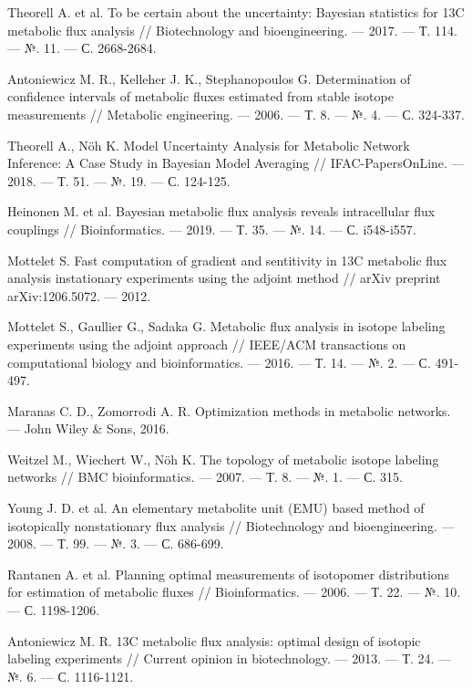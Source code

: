 \documentclass[14pt, a4paper]{extreport}
\begin{document}
\begin{thebibliography}{XXXX}
	
	Theorell A. et al. To be certain about the uncertainty: Bayesian statistics for 13C metabolic flux analysis // Biotechnology and bioengineering. --- 2017. --- Т. 114. --- №. 11. --- С. 2668-2684.
	
	Antoniewicz M. R., Kelleher J. K., Stephanopoulos G. Determination of confidence intervals of metabolic fluxes estimated from stable isotope measurements // Metabolic engineering. --- 2006. --- Т. 8. --- №. 4. --- С. 324-337.
	
	Theorell A., Nöh K. Model Uncertainty Analysis for Metabolic Network Inference: A Case Study in Bayesian Model Averaging // IFAC-PapersOnLine. --- 2018. --- Т. 51. --- №. 19. --- С. 124-125.
	
	Heinonen M. et al. Bayesian metabolic flux analysis reveals intracellular flux couplings // Bioinformatics. --- 2019. --- Т. 35. --- №. 14. --- С. i548-i557.
	
	Mottelet S. Fast computation of gradient and sentitivity in 13C metabolic flux analysis instationary experiments using the adjoint method // arXiv preprint arXiv:1206.5072. --- 2012.
	
	Mottelet S., Gaullier G., Sadaka G. Metabolic flux analysis in isotope labeling experiments using the adjoint approach // IEEE/ACM transactions on computational biology and bioinformatics. --- 2016. --- Т. 14. --- №. 2. --- С. 491-497.
	
	Maranas C. D., Zomorrodi A. R. Optimization methods in metabolic networks. --- John Wiley \& Sons, 2016.
	
	Weitzel M., Wiechert W., Nöh K. The topology of metabolic isotope labeling networks // BMC bioinformatics. --- 2007. --- Т. 8. --- №. 1. --- С. 315.
	
	Young J. D. et al. An elementary metabolite unit (EMU) based method of isotopically nonstationary flux analysis // Biotechnology and bioengineering. --- 2008. --- Т. 99. --- №. 3. --- С. 686-699.
	
	Rantanen A. et al. Planning optimal measurements of isotopomer distributions for estimation of metabolic fluxes // Bioinformatics. --- 2006. --- Т. 22. --- №. 10. --- С. 1198-1206.
	
	Antoniewicz M. R. 13C metabolic flux analysis: optimal design of isotopic labeling experiments // Current opinion in biotechnology. --- 2013. --- Т. 24. --- №. 6. --- С. 1116-1121.
	

\end{thebibliography}
\end{document}
